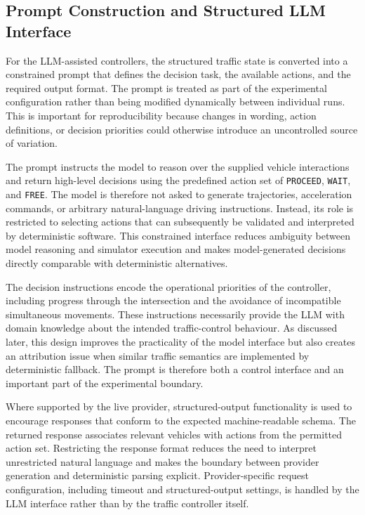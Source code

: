 \documentclass[letterpaper,10pt,conference]{ieeeconf}
\begin{document}
\subsection{Prompt Construction and Structured LLM Interface}



For the LLM-assisted controllers, the structured traffic state is converted into a constrained prompt that defines the decision task, the available actions, and the required output format. The prompt is treated as part of the experimental configuration rather than being modified dynamically between individual runs. This is important for reproducibility because changes in wording, action definitions, or decision priorities could otherwise introduce an uncontrolled source of variation.



The prompt instructs the model to reason over the supplied vehicle interactions and return high-level decisions using the predefined action set of \texttt{PROCEED}, \texttt{WAIT}, and \texttt{FREE}. The model is therefore not asked to generate trajectories, acceleration commands, or arbitrary natural-language driving instructions. Instead, its role is restricted to selecting actions that can subsequently be validated and interpreted by deterministic software. This constrained interface reduces ambiguity between model reasoning and simulator execution and makes model-generated decisions directly comparable with deterministic alternatives.



The decision instructions encode the operational priorities of the controller, including progress through the intersection and the avoidance of incompatible simultaneous movements. These instructions necessarily provide the LLM with domain knowledge about the intended traffic-control behaviour. As discussed later, this design improves the practicality of the model interface but also creates an attribution issue when similar traffic semantics are implemented by deterministic fallback. The prompt is therefore both a control interface and an important part of the experimental boundary.



Where supported by the live provider, structured-output functionality is used to encourage responses that conform to the expected machine-readable schema. The returned response associates relevant vehicles with actions from the permitted action set. Restricting the response format reduces the need to interpret unrestricted natural language and makes the boundary between provider generation and deterministic parsing explicit. Provider-specific request configuration, including timeout and structured-output settings, is handled by the LLM interface rather than by the traffic controller itself.
\end{document}
